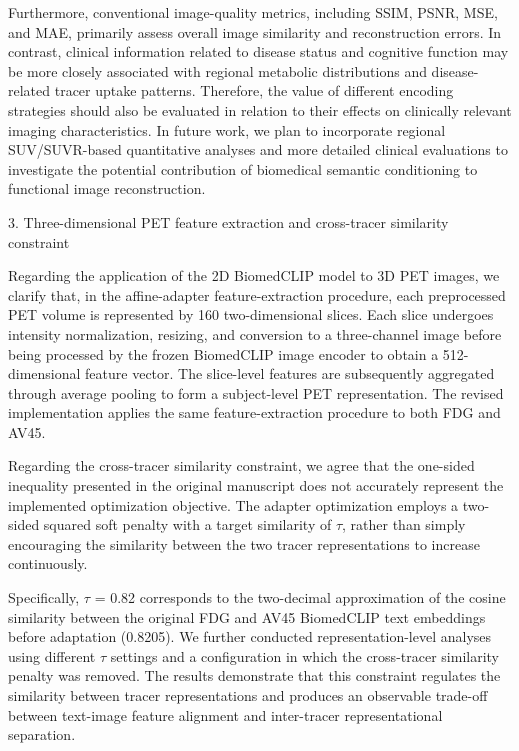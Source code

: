 {Furthermore, conventional image-quality metrics, including SSIM, PSNR, MSE, and MAE, primarily assess overall image similarity and reconstruction errors. In contrast, clinical information related to disease status and cognitive function may be more closely associated with regional metabolic distributions and disease-related tracer uptake patterns. Therefore, the value of different encoding strategies should also be evaluated in relation to their effects on clinically relevant imaging characteristics. In future work, we plan to incorporate regional SUV/SUVR-based quantitative analyses and more detailed clinical evaluations to investigate the potential contribution of biomedical semantic conditioning to functional image reconstruction.

3. Three-dimensional PET feature extraction and cross-tracer similarity constraint

Regarding the application of the 2D BiomedCLIP model to 3D PET images, we clarify that, in the affine-adapter feature-extraction procedure, each preprocessed PET volume is represented by 160 two-dimensional slices. Each slice undergoes intensity normalization, resizing, and conversion to a three-channel image before being processed by the frozen BiomedCLIP image encoder to obtain a 512-dimensional feature vector. The slice-level features are subsequently aggregated through average pooling to form a subject-level PET representation. The revised implementation applies the same feature-extraction procedure to both FDG and AV45.

Regarding the cross-tracer similarity constraint, we agree that the one-sided inequality presented in the original manuscript does not accurately represent the implemented optimization objective. The adapter optimization employs a two-sided squared soft penalty with a target similarity of \ensuremath{\tau}, rather than simply encouraging the similarity between the two tracer representations to increase continuously.

Specifically, \ensuremath{\tau} = 0.82 corresponds to the two-decimal approximation of the cosine similarity between the original FDG and AV45 BiomedCLIP text embeddings before adaptation (0.8205). We further conducted representation-level analyses using different \ensuremath{\tau} settings and a configuration in which the cross-tracer similarity penalty was removed. The results demonstrate that this constraint regulates the similarity between tracer representations and produces an observable trade-off between text-image feature alignment and inter-tracer representational separation.

}
